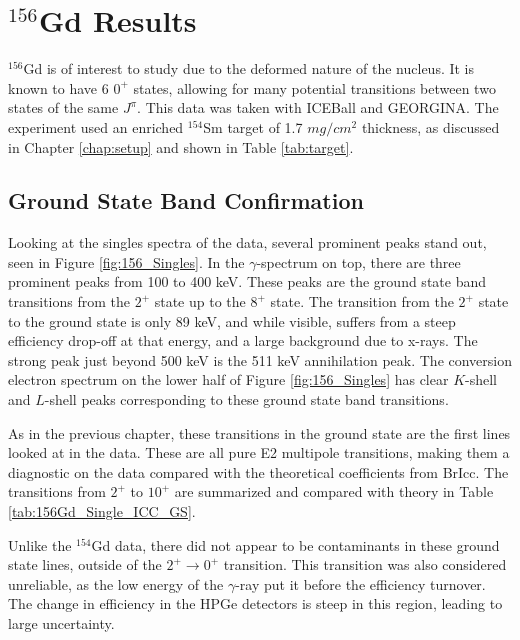 \chapter{$^{156}$Gd Results}
\normalsize

$^{156}$Gd is of interest to study due to the deformed nature of the nucleus. It is known to have 6 $0^+$ states, allowing for many potential transitions between two states of the same $J^\pi$. This data was taken with ICEBall and GEORGINA. The experiment used an enriched $^{154}$Sm target of 1.7 $mg/cm^2$ thickness, as discussed in Chapter \ref{chap:setup} and shown in Table \ref{tab:target}.

\section{Ground State Band Confirmation}

Looking at the singles spectra of the data, several prominent peaks stand out, seen in Figure \ref{fig:156_Singles}. In the $\gamma$-spectrum on top, there are three prominent peaks from 100 to 400 keV. These peaks are the ground state band transitions from the $2^+$ state up to the $8^+$ state. The transition from the $2^+$ state to the ground state is only 89 keV, and while visible, suffers from a steep efficiency drop-off at that energy, and a large background due to x-rays. The strong peak just beyond 500 keV is the 511 keV annihilation peak. The conversion electron spectrum on the lower half of Figure \ref{fig:156_Singles} has clear $K$-shell and $L$-shell peaks corresponding to these ground state band transitions. 



As in the previous chapter, these transitions in the ground state are the first lines looked at in the data. These are all pure E2 multipole transitions, making them a diagnostic on the data compared with the theoretical coefficients from BrIcc\citep{kibedi08:_BRICC}. The transitions from $2^+$ to $10^+$ are summarized and compared with theory in Table \ref{tab:156Gd_Single_ICC_GS}.



Unlike the $^{154}$Gd data, there did not appear to be contaminants in these ground state lines, outside of the $2^+\rightarrow0^+$ transition. This transition was also considered unreliable, as the low energy of the $\gamma$-ray put it before the efficiency turnover. The change in efficiency in the HPGe detectors is steep in this region, leading to large uncertainty.

